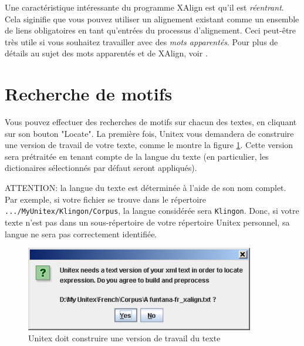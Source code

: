 \bigskip
\noindent Une caractéristique intéressante du programme XAlign est qu'il est
\textit{réentrant}. Cela siginifie que vous pouvez utiliser
un alignement existant comme un ensemble de liens obligatoires en tant qu'entrées du processus
d'alignement. Ceci peut-être très utile si vous souhaitez travailler avec des
\textit{mots apparentés}. Pour plus de détails au sujet des mots apparentés
 et de XAlign, voir \cite{IGML_PauDum08}.

\clearpage
\section{Recherche de motifs}
Vous pouvez effectuer des recherches de motifs sur chacun des textes, en cliquant sur son bouton
"Locate". La première fois, Unitex vous demandera de construire une version de travail de votre
texte, comme le montre la figure \ref{fig-x-fig6}. Cette version sera prétraitée en tenant compte de
la langue du texte (en particulier, les dictionaires sélectionnés par défaut seront appliqués).

\bigskip
\noindent ATTENTION: la langue du texte est déterminée à l'aide de son nom complet. Par exemple, 
si votre fichier se trouve dans le répertoire \verb+.../MyUnitex/Klingon/Corpus+, 
la langue considérée sera \verb+Klingon+. Donc, si votre texte n'est pas dans un sous-répertoire
de votre répertoire Unitex personnel, sa langue ne sera pas correctement identifiée.

\begin{figure}[!ht]
\begin{center}
\includegraphics[width=10cm]{resources/img/figX-6.png}
\caption{Unitex doit construire une version de travail du texte\label{fig-x-fig6}}
\end{center}
\end{figure}
 
